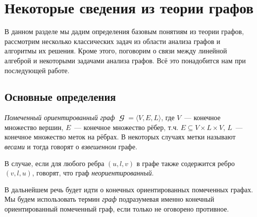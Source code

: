 \setchapterpreamble[u]{\margintoc}
\chapter{Некоторые сведения из теории графов}
\label{chpt:GraphTheoryIntro}

В данном разделе мы дадим определения базовым понятиям из теории графов, рассмотрим несколько классических задач из области анализа графов и алгоритмы их решения.
Кроме этого, поговорим о связи между линейной алгеброй и некоторыми задачами анализа графов.
Всё это понадобится нам при последующей работе.

\section{Основные определения}

\begin{definition}
    \emph{Помеченный ориентированный граф} $\mbfscrG = \langle V, E, L \rangle$, где $V$~--- конечное множество вершин, $E$~--- конечное множество рёбер, т.ч. $E \subseteq V \times L \times V$, $L$~--- конечное множество меток на рёбрах.
    В некоторых случаях метки называют \emph{весами}%
    и тогда говорят о \emph{взвешенном} графе.
\end{definition}

\begin{definition}
    В случае, если для любого ребра $(u, l, v)$ в графе также содержится ребро $(v, l, u)$, говорят, что граф \emph{неориентированный}.
\end{definition}

В дальнейшем речь будет идти о конечных ориентированных помеченных графах.
Мы будем использовать термин \emph{граф} подразумевая именно конечный ориентированный помеченный граф, если только не оговорено противное.


